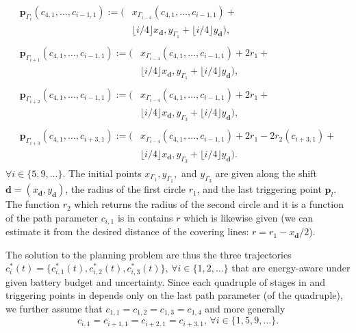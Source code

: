 \begin{subequations}\label{eq:ex-pb-trigs}\begin{align}
  \begin{split}
  \mathbf{p}_{\Gamma_i}(c_{4,1},\dots,c_{i-1,1}):=(&x_{\Gamma_{i-4}}(c_{4,1},\dots,c_{i-1,1})+\\
  &\lfloor i/4\rfloor x_\mathbf{d},y_{\Gamma_1}+\lfloor i/4\rfloor y_\mathbf{d}),\end{split}\\
  \begin{split}
  \mathbf{p}_{\Gamma_{i+1}}(c_{4,1},\dots,c_{i-1,1}):=(&x_{\Gamma_{i-4}}(c_{4,1},\dots,c_{i-1,1})+2r_1+\\
  &\lfloor i/4\rfloor x_\mathbf{d},y_{\Gamma_1}+\lfloor i/4\rfloor y_\mathbf{d}),\end{split}\\
  \begin{split}
  \mathbf{p}_{\Gamma_{i+2}}(c_{4,1},\dots,c_{i-1,1}):=(&x_{\Gamma_{i-4}}(c_{4,1},\dots,c_{i-1,1})+2r_1+\\
  &\lfloor i/4\rfloor x_\mathbf{d},y_{\Gamma_3}+\lfloor i/4\rfloor y_\mathbf{d}),\end{split}\\
  \begin{split}
  \mathbf{p}_{\Gamma_{i+3}}(c_{4,1},\dots,c_{i+3,1}):=(&x_{\Gamma_{i-4}}(c_{4,1},\dots,c_{i-1,1})+2r_1-2r_2(c_{i+3,1})+\\
  &\lfloor i/4\rfloor x_\mathbf{d},y_{\Gamma_3}+\lfloor i/4\rfloor y_\mathbf{d}).\end{split}
\end{align}
\end{subequations}
$\forall i\in\{5,9,\dots\}$. The initial points $x_{\Gamma_1},y_{\Gamma_1},$ and $y_{\Gamma_3}$ are given along the shift $\mathbf{d}=(x_\mathbf{d},y_\mathbf{d})$, the radius of the first circle $r_1$, and the last triggering point $\mathbf{p}_l$. The function $r_2$ which returns the radius of the second circle and it is a function of the path parameter $c_{i,1}$ is in  contains $r$ which is likewise given (we can estimate it from the desired distance of the covering lines: $r=r_1-x_\mathbf{d}/2$).

The solution to the planning problem are thus the three trajectories $c_i^*(t)=\{c_{i,1}^*(t),c_{i,2}^*(t),c_{i,3}^*(t)\},\,\forall i\in\{1,2,\dots\}$ that are energy-aware under given battery budget and uncertainty. 
Since each quadruple of stages in  and triggering points in  depends only on the last path parameter (of the quadruple), we further assume that $c_{1,1}=c_{1,2}=c_{1,3}=c_{1,4}$ and more generally 
\begin{equation}
c_{i,1}=c_{i+1,1}=c_{i+2,1}=c_{i+3,1},\,\forall i\in\{1,5,9,\dots\}.
\end{equation}

